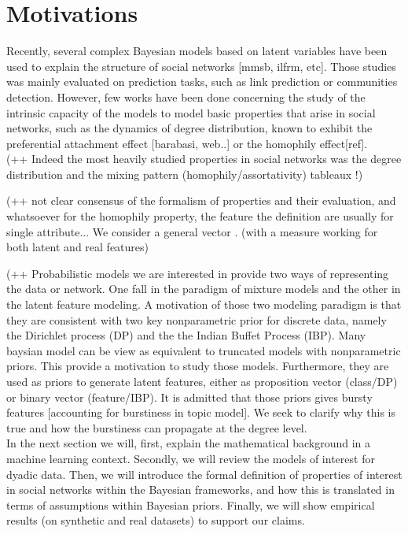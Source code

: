 \section{Motivations}
Recently, several complex Bayesian models based on latent variables have been used to explain the structure of social networks [mmsb, ilfrm, etc]. Those studies was mainly evaluated on prediction tasks, such as link prediction or communities detection. However, few works have been done concerning the study of the intrinsic capacity of the models to model basic properties that arise in social networks, such as the dynamics of degree distribution, known to exhibit the preferential attachment effect [barabasi, web..] or the homophily effect[ref].
~\\


(++ Indeed the most heavily studied properties in social networks was the degree distribution and the mixing pattern (homophily/assortativity) tableaux !)

(++ not clear consensus of the formalism of properties and their evaluation, and whatsoever for the homophily property, the feature the definition are usually for single attribute... We consider a general vector . (with a measure working for both latent and real features)

(++ Probabilistic models we are interested in provide two ways of representing the data or network. One fall in the paradigm of mixture models and the other in the latent feature modeling. A motivation of those two modeling paradigm is that they are consistent with two key nonparametric prior for discrete data, namely the Dirichlet process (DP) and the the Indian Buffet Process (IBP). Many baysian model can be view as equivalent to truncated models with nonparametric priors. This provide a motivation to study those models. Furthermore, they are used as priors to generate latent features, either as proposition vector (class/DP) or binary vector (feature/IBP). It is admitted that those priors gives bursty features [accounting for burstiness in topic model]. We seek to clarify why this is true and how the burstiness can propagate at the degree level.~\\


In the next section we will, first, explain the mathematical background in a machine learning context. Secondly, we will review the models of interest for dyadic data. Then, we will introduce the formal definition of properties of interest in social networks within the Bayesian frameworks, and how this is translated in terms of assumptions within Bayesian priors. Finally, we will show empirical results (on synthetic and real datasets) to support our claims.~\\


